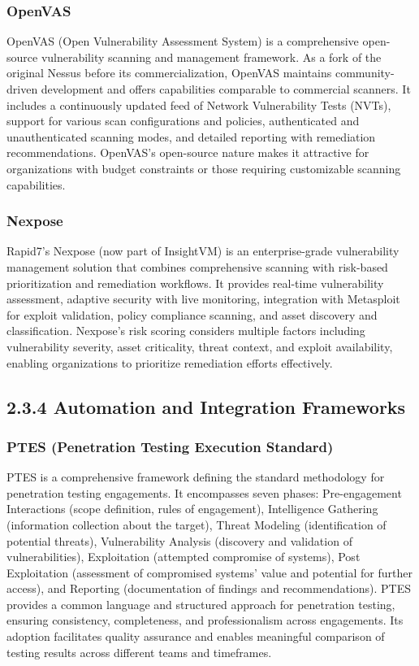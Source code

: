 \documentclass[12pt,a4paper]{report}
\begin{document}
\subsubsection{OpenVAS}

OpenVAS (Open Vulnerability Assessment System) is a comprehensive open-source vulnerability scanning and management framework. As a fork of the original Nessus before its commercialization, OpenVAS maintains community-driven development and offers capabilities comparable to commercial scanners. It includes a continuously updated feed of Network Vulnerability Tests (NVTs), support for various scan configurations and policies, authenticated and unauthenticated scanning modes, and detailed reporting with remediation recommendations. OpenVAS's open-source nature makes it attractive for organizations with budget constraints or those requiring customizable scanning capabilities.

\subsubsection{Nexpose}

Rapid7's Nexpose (now part of InsightVM) is an enterprise-grade vulnerability management solution that combines comprehensive scanning with risk-based prioritization and remediation workflows. It provides real-time vulnerability assessment, adaptive security with live monitoring, integration with Metasploit for exploit validation, policy compliance scanning, and asset discovery and classification. Nexpose's risk scoring considers multiple factors including vulnerability severity, asset criticality, threat context, and exploit availability, enabling organizations to prioritize remediation efforts effectively.

\subsection{2.3.4 Automation and Integration Frameworks}

\subsubsection{PTES (Penetration Testing Execution Standard)}

PTES is a comprehensive framework defining the standard methodology for penetration testing engagements. It encompasses seven phases: Pre-engagement Interactions (scope definition, rules of engagement), Intelligence Gathering (information collection about the target), Threat Modeling (identification of potential threats), Vulnerability Analysis (discovery and validation of vulnerabilities), Exploitation (attempted compromise of systems), Post Exploitation (assessment of compromised systems' value and potential for further access), and Reporting (documentation of findings and recommendations). PTES provides a common language and structured approach for penetration testing, ensuring consistency, completeness, and professionalism across engagements. Its adoption facilitates quality assurance and enables meaningful comparison of testing results across different teams and timeframes.
\end{document}
